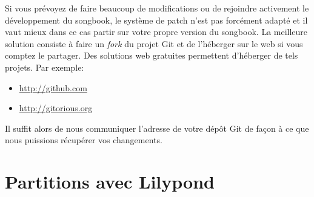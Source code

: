\documentclass[versionenligne]{patacrep}
\begin{document}
Si vous prévoyez de faire beaucoup de modifications ou de rejoindre
activement le développement du songbook, le système de patch n'est pas
forcément adapté et il vaut mieux dans ce cas partir sur votre propre
version du songbook. La meilleure solution consiste à faire un
\emph{fork} du projet Git et de l'héberger sur le web si vous comptez
le partager. Des solutions web gratuites permettent d'héberger de tels
projets. Par exemple:
\begin{itemize}
\item \url{http://github.com}
\item \url{http://gitorious.org}
\end{itemize}

Il suffit alors de nous communiquer l'adresse de votre dépôt Git de
façon à ce que nous puissions récupérer vos changements.



%
%
%
%
%


\section{Partitions avec Lilypond}
\end{document}
